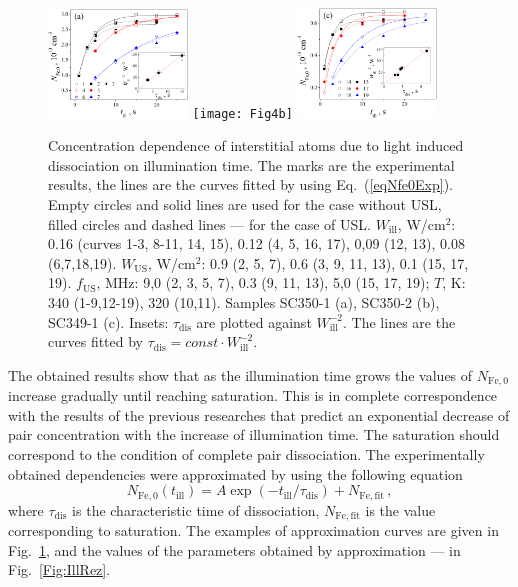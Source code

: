 \documentclass[%
 aip,jap,
 amsmath,amssymb,
 reprint,%
]{revtex4-1}
\begin{document}
\begin{figure}
\includegraphics[width=0.33\textwidth]{Fig4a}%
\texttt{[image: Fig4b]}%
\includegraphics[width=0.33\textwidth]{Fig4c}%
\caption{\label{Fig:Nfe_till}
Concentration dependence of interstitial atoms due to light induced dissociation on illumination time.
The marks are the experimental results, the lines are the curves  fitted by using Eq.~(\ref{eqNfe0Exp}).
Empty circles and solid lines are used for  the case without USL,
filled circles and dashed lines --- for the case of USL.
$W_\mathrm{ill}$, W/cm$^2$: 0.16 (curves 1-3, 8-11, 14, 15),
0.12 (4, 5, 16, 17), 0,09 (12, 13), 0.08 (6,7,18,19).
$W_\mathrm{US}$, W/cm$^2$:
0.9 (2, 5, 7), 0.6 (3, 9, 11, 13), 0.1 (15, 17, 19).
$f_\mathrm{US}$, MHz:
9,0 (2, 3, 5, 7), 0.3 (9, 11, 13), 5,0 (15, 17, 19);
$T$, K:
340 (1-9,12-19), 320 (10,11).
Samples SC350-1 (a), SC350-2 (b), SC349-1 (c).
Insets: $\tau_\mathrm{dis}$ are plotted against $W_\mathrm{ill}^{-2}$.
The lines are the curves fitted by $\tau_\mathrm{dis}=const\cdot W_\mathrm{ill}^{-2}$.
}
\end{figure}


The obtained results show that as the illumination time grows
the values of $N_\mathrm{Fe,0}$ increase gradually until reaching saturation.
This is in complete correspondence with the results of the previous researches \cite{FeBLight2,FeBAssJAP2014,FeBKin2019}
that predict an exponential decrease of pair concentration with the increase of illumination time.
The saturation should correspond to the condition of complete pair dissociation.
The experimentally obtained dependencies were approximated by using the following equation
\begin{equation}
\label{eqNfe0Exp}
N_\mathrm{Fe,0}(t_\mathrm{ill})=A\exp(-t_\mathrm{ill}/\tau_\mathrm{dis})
+N_\mathrm{Fe,fit}\,,
\end{equation}
where
$\tau_\mathrm{dis}$ is the characteristic time of dissociation,
$N_\mathrm{Fe,fit}$ is the value corresponding to saturation.
The examples of approximation curves are given in Fig.~\ref{Fig:Nfe_till},
and the values of the parameters obtained by approximation --- in Fig.~\ref{Fig:IllRez}.
\end{document}
